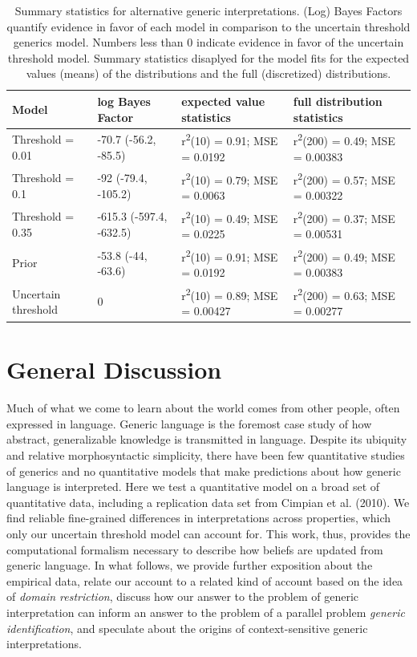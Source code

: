 \documentclass[floatsintext,doc]{apa6}
\theoremstyle{definition}
\theoremstyle{definition}
\theoremstyle{definition}
\theoremstyle{remark}
\begin{document}
\begin{table}[h]
\centering
\begingroup\fontsize{9pt}{10pt}\selectfont
\begin{tabular}{llll}
  \hline
Model & log Bayes Factor & expected value statistics & full distribution statistics \\ 
  \hline
Threshold = 0.01 & -70.7 (-56.2, -85.5) & r\textsuperscript{2}(10) = 0.91; MSE = 0.0192 & r\textsuperscript{2}(200) = 0.49; MSE = 0.00383 \\ 
  Threshold = 0.1 & -92 (-79.4, -105.2) & r\textsuperscript{2}(10) = 0.79; MSE = 0.0063 & r\textsuperscript{2}(200) = 0.57; MSE = 0.00322 \\ 
  Threshold = 0.35 & -615.3 (-597.4, -632.5) & r\textsuperscript{2}(10) = 0.49; MSE = 0.0225 & r\textsuperscript{2}(200) = 0.37; MSE = 0.00531 \\ 
  Prior & -53.8 (-44, -63.6) & r\textsuperscript{2}(10) = 0.91; MSE = 0.0192 & r\textsuperscript{2}(200) = 0.49; MSE = 0.00383 \\ 
  Uncertain threshold & 0 & r\textsuperscript{2}(10) = 0.89; MSE = 0.00427 & r\textsuperscript{2}(200) = 0.63; MSE = 0.00277 \\ 
   \hline
\end{tabular}
\endgroup
\caption{Summary statistics for alternative generic interpretations. (Log) Bayes Factors quantify evidence in favor of each model in comparison to the uncertain threshold generics model. Numbers less than 0 indicate evidence in favor of the uncertain threshold model. Summary statistics disaplyed for the model fits for the expected values (means) of the distributions and the full (discretized) distributions.} 
\end{table}

\section{General Discussion}\label{general-discussion}

Much of what we come to learn about the world comes from other people,
often expressed in language. Generic language is the foremost case study
of how abstract, generalizable knowledge is transmitted in language.
Despite its ubiquity and relative morphosyntactic simplicity, there have
been few quantitative studies of generics and no quantitative models
that make predictions about how generic language is interpreted. Here we
test a quantitative model on a broad set of quantitative data, including
a replication data set from Cimpian et al. (2010). We find reliable
fine-grained differences in interpretations across properties, which
only our uncertain threshold model can account for. This work, thus,
provides the computational formalism necessary to describe how beliefs
are updated from generic language. In what follows, we provide further
exposition about the empirical data, relate our account to a related
kind of account based on the idea of \emph{domain restriction}, discuss
how our answer to the problem of generic interpretation can inform an
answer to the problem of a parallel problem \emph{generic
identification}, and speculate about the origins of context-sensitive
generic interpretations.
\end{document}
